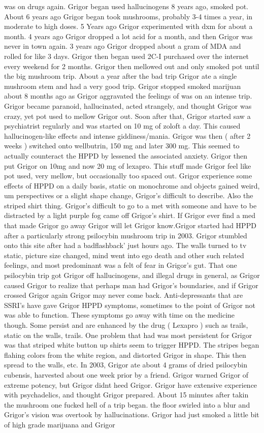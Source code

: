 \documentclass[12pt]{book}
\begin{document}
was on drugs again. Grigor began used hallucinogens 8 years ago, smoked pot. About 6 years ago Grigor began took mushrooms, probably 3-4 times a year, in moderate to high doses. 5 Years ago Grigor experimented with dxm for about a month. 4 years ago Grigor dropped a lot acid for a month, and then Grigor was never in town again. 3 years ago Grigor dropped about a gram of MDA and rolled for like 3 days. Grigor then began used 2C-I purchased over the internet every weekend for 2 months. Grigor then mellowed out and only smoked pot until the big mushroom trip. About a year after the bad trip Grigor ate a single mushroom stem and had a very good trip. Grigor stopped smoked marijuan about 8 months ago as Grigor aggravated the feelings of was on an intense trip. Grigor became paranoid, hallucinated, acted strangely, and thought Grigor was crazy, yet pot used to mellow Grigor out. Soon after that, Grigor started saw a psychiatrist regularly and was started on 10 mg of zoloft a day. This caused hallucinogen-like effects and intense giddiness/mania. Grigor was then ( after 2 weeks ) switched onto wellbutrin, 150 mg and later 300 mg. This seemed to actually counteract the HPPD by lessened the associated anxiety. Grigor then put Grigor on 10mg and now 20 mg of lexapro. This stuff made Grigor feel like pot used, very mellow, but occasionally too spaced out. Grigor experience some effects of HPPD on a daily basis, static on monochrome and objects gained weird, um perspectives or a slight shape change, Grigor's difficult to describe. Also the striped shirt thing. Grigor's difficult to go to a met with someone and have to be distracted by a light purple fog came off Grigor's shirt. If Grigor ever find a med that made Grigor go away Grigor will let Grigor know.Grigor started had HPPD after a particularly strong psilocybin mushroom trip in 2003. Grigor stumbled onto this site after had a badflashback' just hours ago. The walls turned to tv static, picture size changed, mind went into ego death and other such related feelings, and most predominant was a felt of fear in Grigor's gut. That one psilocybin trip got Grigor off hallucinogens, and illegal drugs in general, as Grigor caused Grigor to realize that perhaps man had Grigor's boundaries, and if Grigor crossed Grigor again Grigor may never come back. Anti-depressants that are SSRI's have gave Grigor HPPD symptoms, sometimes to the point of Grigor not was able to function. These symptoms go away with time on the medicine though. Some persist and are enhanced by the drug ( Lexapro ) such as trails, static on the walls, trails. One problem that had was most persistent for Grigor was that striped white button up shirts seem to trigger HPPD. The stripes began flahing colors from the white region, and distorted Grigor in shape. This then spread to the walls, etc. In 2003, Grigor ate about 4 grams of dried psilocybin cubensis, harvested about one week prior by a friend. Grigor warned Grigor of extreme potency, but Grigor didnt heed Grigor. Grigor have extensive experience with psychadelics, and thought Grigor prepared. About 15 minutes after takin the mushroom one fucked hell of a trip began. the floor swirled into a blur and Grigor's vision was overtook by hallucinations. Grigor had just smoked a little bit of high grade marijuana and Grigor 
\end{document}
